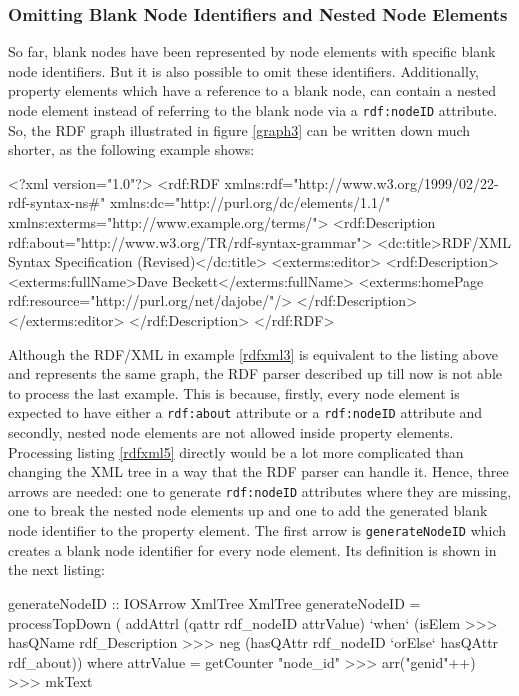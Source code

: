 \documentclass[11pt,a4paper,headsepline, bibtotoc]{scrreprt}
\begin{document}
\subsubsection{Omitting Blank Node Identifiers and Nested Node Elements}
So far, blank nodes have been represented by node elements with specific blank node identifiers. But it is also possible to omit these identifiers. Additionally, property elements which have a reference to a blank node, can contain a nested node element instead of referring to the blank node via a \texttt{rdf:nodeID} attribute. So, the RDF graph illustrated in figure \ref{graph3} can be written down much shorter, as the following example shows:
\clearpage
\begin{xmlnb}[caption={Blank Nodes without Identifiers},label={rdfxml5}]
<?xml version="1.0"?>
<rdf:RDF xmlns:rdf="http://www.w3.org/1999/02/22-rdf-syntax-ns#"
            xmlns:dc="http://purl.org/dc/elements/1.1/"
            xmlns:exterms="http://www.example.org/terms/">
  <rdf:Description rdf:about="http://www.w3.org/TR/rdf-syntax-grammar">
    <dc:title>RDF/XML Syntax Specification (Revised)</dc:title>
    <exterms:editor>
      <rdf:Description>
        <exterms:fullName>Dave Beckett</exterms:fullName>
        <exterms:homePage rdf:resource="http://purl.org/net/dajobe/"/>
      </rdf:Description>
    </exterms:editor>
  </rdf:Description>
</rdf:RDF>
\end{xmlnb}
Although the RDF/XML in example \ref{rdfxml3} is equivalent to the listing above and represents the same graph, the RDF parser described up till now is not able to process the last example. This is because, firstly, every node element is expected to have either a \texttt{rdf:about} attribute or a \texttt{rdf:nodeID} attribute and secondly, nested node elements are not allowed inside property elements. Processing listing \ref{rdfxml5} directly would be a lot more complicated than changing the XML tree in a way that the RDF parser can handle it. Hence, three arrows are needed: one to generate \texttt{rdf:nodeID} attributes where they are missing, one to break the nested node elements up and one to add the generated blank node identifier to the property element. The first arrow is \texttt{generateNodeID} which creates a blank node identifier for every node element. Its definition is shown in the next listing:
\begin{code}[basicstyle=\ttfamily\small]
generateNodeID :: IOSArrow XmlTree XmlTree
generateNodeID
  = processTopDown (
      addAttrl (qattr rdf_nodeID attrValue)
      `when`
      (isElem >>> hasQName rdf_Description 
       >>> neg (hasQAttr rdf_nodeID `orElse` hasQAttr rdf_about))
    where attrValue 
            = getCounter "node_id" >>> arr("genid"++) >>> mkText
\end{code}
\end{document}
